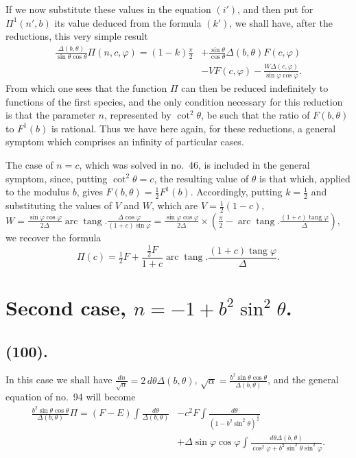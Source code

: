 \documentclass{article}
\begin{document}
If we now substitute these values in the equation $(i')$, and then put for $\Pi^{1}(n',b)$ its value deduced from the formula $(k')$, we shall have, after the reductions, this very simple result
\[ \begin{aligned} \frac{\Delta(b,\theta)}{\sin\theta\cos\theta}\Pi(n,c,\varphi)=(1-k)\frac{\pi}{2}&+\frac{\sin\theta}{\cos\theta}\Delta(b,\theta)F(c,\varphi)\\ &-VF(c,\varphi)-\frac{W\Delta(c,\varphi)}{\sin\varphi\cos\varphi}. \end{aligned} \]
From which one sees that the function $\Pi$ can then be reduced indefinitely to functions of the first species, and the only condition necessary for this reduction is that the parameter $n$, represented by $\cot^{2}\theta$, be such that the ratio of $F(b,\theta)$ to $F^{1}(b)$ is rational. Thus we have here again, for these reductions, a general symptom which comprises an infinity of particular cases.

The case of $n=c$, which was solved in no.\ 46, is included in the general symptom, since, putting $\cot^{2}\theta=c$, the resulting value of $\theta$ is that which, applied to the modulus $b$, gives $F(b,\theta)=\tfrac{1}{2}F^{1}(b)$. Accordingly, putting $k=\tfrac{1}{2}$ and substituting the values of $V$ and $W$, which are $V=\tfrac{1}{2}(1-c)$, $W=\frac{\sin\varphi\cos\varphi}{2\Delta}\operatorname{arc}\operatorname{tang}.\frac{\Delta\cos\varphi}{(1+c)\sin\varphi}=\frac{\sin\varphi\cos\varphi}{2\Delta}\times\left(\frac{\pi}{2}-\operatorname{arc}\operatorname{tang}.\frac{(1+c)\operatorname{tang}\varphi}{\Delta}\right)$, we recover the formula
\[ \Pi(c)=\tfrac{1}{2}F+\frac{\tfrac{1}{2}F}{1+c}\operatorname{arc}\operatorname{tang}.\frac{(1+c)\operatorname{tang}\varphi}{\Delta}. \]

\section*{Second case, $n=-1+b^{2}\sin^{2}\theta$.}

\subsection*{(100).}

In this case we shall have $\frac{dn}{\sqrt{\alpha}}=2\,d\theta\Delta(b,\theta)$, $\sqrt{\alpha}=\frac{b^{2}\sin\theta\cos\theta}{\Delta(b,\theta)}$, and the general equation of no.\ 94 will become
\[ \begin{aligned} \frac{b^{2}\sin\theta\cos\theta}{\Delta(b,\theta)}\Pi=(F-E)\int\frac{d\theta}{\Delta(b,\theta)}&-c^{2}F\int\frac{d\theta}{(1-b^{2}\sin^{2}\theta)^{\frac{3}{2}}}\\ &+\Delta\sin\varphi\cos\varphi\int\frac{d\theta\Delta(b,\theta)}{\cos^{2}\varphi+b^{2}\sin^{2}\theta\sin^{2}\varphi}. \end{aligned} \]
\end{document}
